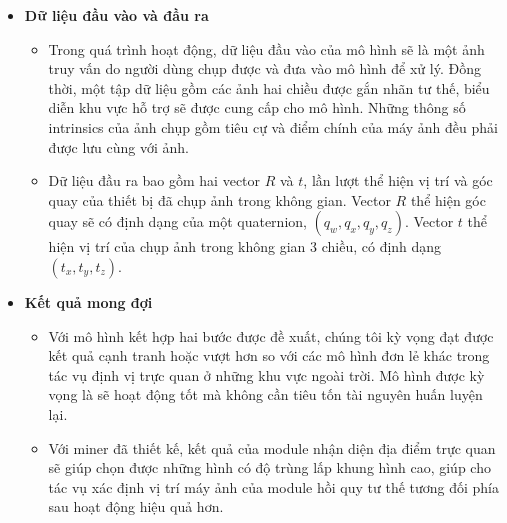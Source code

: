 \begin{itemize}
  \item \textbf{Dữ liệu đầu vào và đầu ra}
        \begin{itemize}
          \item Trong quá trình hoạt động, dữ liệu đầu vào của mô hình sẽ là một ảnh truy vấn do người dùng chụp được và đưa vào mô hình để xử lý. Đồng thời, một tập dữ liệu gồm các ảnh hai chiều được gắn nhãn tư thế, biểu diễn khu vực hỗ trợ sẽ được cung cấp cho mô hình. Những thông số intrinsics của ảnh chụp gồm tiêu cự và điểm chính của máy ảnh đều phải được lưu cùng với ảnh.
          \item Dữ liệu đầu ra bao gồm hai vector $R$ và $t$, lần lượt thể hiện vị trí và góc quay của thiết bị đã chụp ảnh trong không gian. Vector $R$ thể hiện góc quay sẽ có định dạng của một quaternion, $(q_w,q_x,q_y,q_z)$. Vector $t$ thể hiện vị trí của chụp ảnh trong không gian 3 chiều, có định dạng $(t_x,t_y,t_z)$.
        \end{itemize}
  \item \textbf{Kết quả mong đợi}
        \begin{itemize}
          \item Với mô hình kết hợp hai bước được đề xuất, chúng tôi kỳ vọng đạt được kết quả cạnh tranh hoặc vượt hơn so với các mô hình đơn lẻ khác trong tác vụ định vị trực quan ở những khu vực ngoài trời. Mô hình được kỳ vọng là sẽ hoạt động tốt mà không cần tiêu tốn tài nguyên huấn luyện lại.
          \item Với miner đã thiết kế, kết quả của module nhận diện địa điểm trực quan sẽ giúp chọn được những hình có độ trùng lấp khung hình cao, giúp cho tác vụ xác định vị trí máy ảnh của module hồi quy tư thế tương đối phía sau hoạt động hiệu quả hơn.
        \end{itemize}
\end{itemize}



